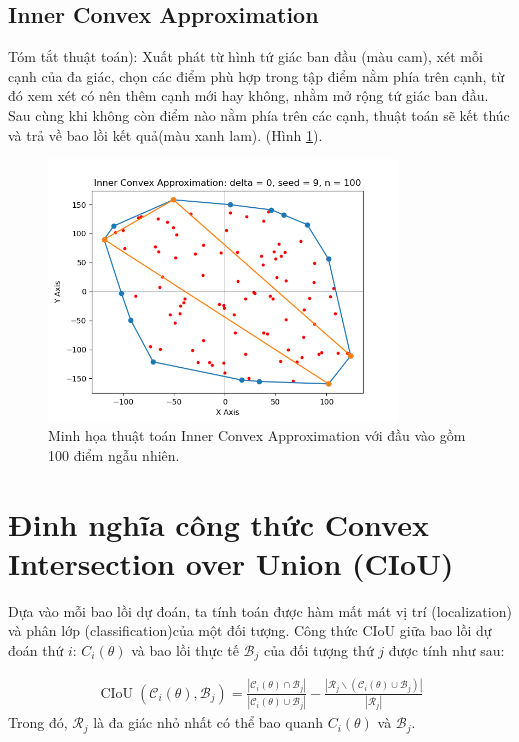 \documentclass[12pt,a4paper,openany,oneside]{report}
\begin{document}
\subsection{Inner Convex Approximation}

Tóm tắt thuật toán): Xuất phát từ hình tứ giác ban đầu (màu cam), xét mỗi cạnh của đa giác, chọn các điểm phù hợp trong tập điểm nằm phía trên cạnh, từ đó xem xét có nên thêm cạnh mới hay không, nhằm mở rộng tứ giác ban đầu. Sau cùng khi không còn điểm nào nằm phía trên các cạnh, thuật toán sẽ kết thúc và trả về bao lồi kết quả(màu xanh lam). (Hình \ref{inner_convex_brief}).

\begin{figure}[ht!]
	\begin{center}
		\includegraphics[width=350px]{./inner_convex_brief.png}
		\caption{Minh họa thuật toán Inner Convex Approximation với đầu vào gồm 100 điểm ngẫu nhiên.}
		\label{inner_convex_brief}
	\end{center}
\end{figure} 
\section{Đinh nghĩa công thức Convex Intersection over Union (CIoU)}
Dựa vào mỗi bao lồi dự đoán, ta tính toán được hàm mất mát vị trí (localization) và phân lớp (classification)của một đối tượng. Công thức CIoU giữa bao lồi dự đoán thứ $i$:  $C_i(\theta)$ và bao lồi thực tế $\mathcal{B}_j$ của đối tượng thứ $j$ được tính như sau:

\begin{align} \label{CioU_fomular}
	\operatorname{CIoU}\left(\mathcal{C}_i(\theta), \mathcal{B}_j\right)=\frac{\left|\mathcal{C}_i(\theta) \cap \mathcal{B}_j\right|}{\left|\mathcal{C}_i(\theta) \cup \mathcal{B}_j\right|}-\frac{\left|\mathcal{R}_j \backslash\left(\mathcal{C}_i(\theta) \cup \mathcal{B}_j\right)\right|}{\left|\mathcal{R}_j\right|}
\end{align}
Trong đó, $\mathcal{R}_j$ là đa giác nhỏ nhất có thể bao quanh  $C_i(\theta)$ và $\mathcal{B}_j$.
\end{document}
